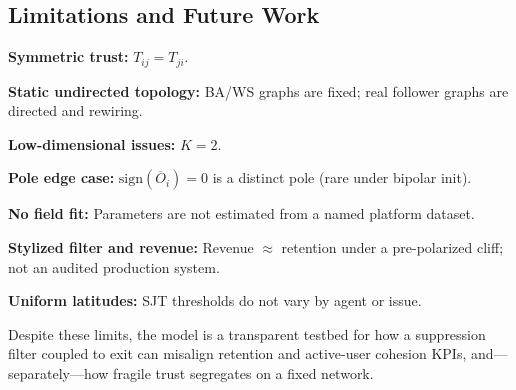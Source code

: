 \subsection{Limitations and Future Work}
\begin{enumerate*}
    \item \textbf{Symmetric trust:} $T_{ij}=T_{ji}$.
    \item \textbf{Static undirected topology:} BA/WS graphs are fixed; real follower graphs are directed and rewiring.
    \item \textbf{Low-dimensional issues:} $K=2$.
    \item \textbf{Pole edge case:} $\mathrm{sign}(\overline{O}_i)=0$ is a distinct pole (rare under bipolar init).
    \item \textbf{No field fit:} Parameters are not estimated from a named platform dataset.
    \item \textbf{Stylized filter and revenue:} Revenue $\approx$ retention under a pre-polarized cliff; not an audited production system.
    \item \textbf{Uniform latitudes:} SJT thresholds do not vary by agent or issue.
\end{enumerate*}
Despite these limits, the model is a transparent testbed for how a suppression filter coupled to exit can misalign retention and active-user cohesion KPIs, and---separately---how fragile trust segregates on a fixed network.
